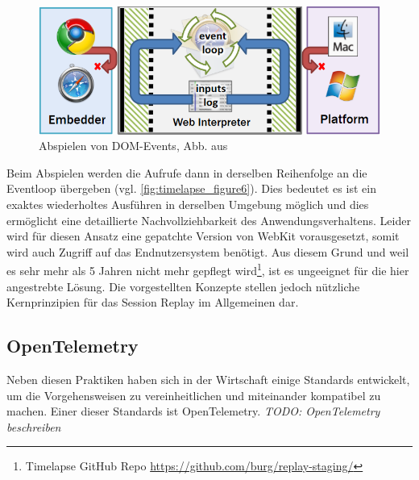 \begin{figure}
\centering
\includegraphics[width=\linewidth]{img/03_methoden/timelapse_figure6.png}
\caption{Abspielen von DOM-Events, Abb. aus \cite{TimelapsePaper}}
\label{fig:timelapse_figure6}
\end{figure}

Beim Abspielen werden die Aufrufe dann in derselben Reihenfolge an die Eventloop übergeben (vgl. \autoref{fig:timelapse_figure6}). Dies bedeutet es ist ein exaktes wiederholtes Ausführen in derselben Umgebung möglich und dies ermöglicht eine detaillierte Nachvollziehbarkeit des Anwendungsverhaltens. Leider wird für diesen Ansatz eine gepatchte Version von WebKit vorausgesetzt, somit wird auch Zugriff auf das Endnutzersystem benötigt. Aus diesem Grund und weil es sehr mehr als 5 Jahren nicht mehr gepflegt wird\footnote{Timelapse GitHub Repo \url{https://github.com/burg/replay-staging/}}, ist es ungeeignet für die hier angestrebte Lösung. Die vorgestellten Konzepte stellen jedoch nützliche Kernprinzipien für das Session Replay im Allgemeinen dar.

\subsection{OpenTelemetry}
\label{subsec:opentelemetry}

Neben diesen Praktiken haben sich in der Wirtschaft einige Standards entwickelt, um die Vorgehensweisen zu vereinheitlichen und miteinander kompatibel zu machen. Einer dieser Standards ist OpenTelemetry. \textit{\color{red} TODO: OpenTelemetry beschreiben}

